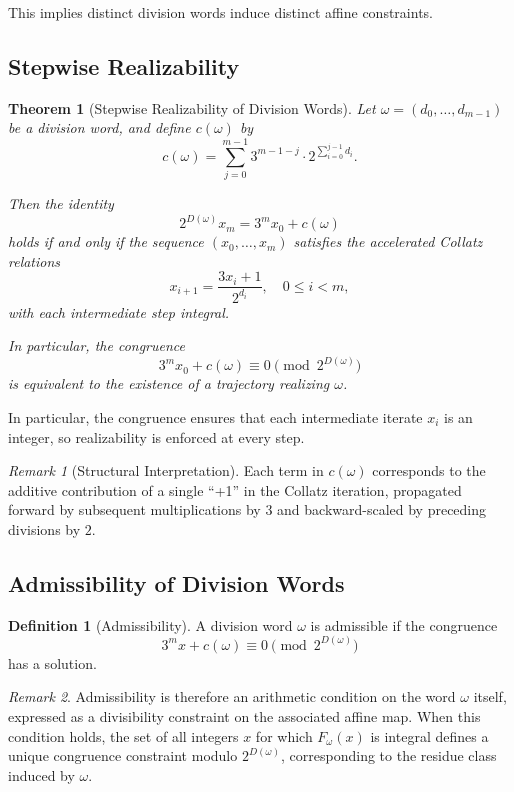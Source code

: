 \documentclass[12pt, oneside]{article}
\numberwithin{equation}{section}
\theoremstyle{definition}
\newtheorem{definition}{Definition}[section]
\theoremstyle{plain}
\newtheorem{theorem}{Theorem}[section]
\theoremstyle{remark}
\newtheorem*{remark}{Remark}
\begin{document}
This implies distinct division words induce distinct affine constraints.

\subsection{Stepwise Realizability}

\begin{theorem}[Stepwise Realizability of Division Words]
\label{thm:stepwise-realizability}
Let $\omega = (d_0,\dots,d_{m-1})$ be a division word, and define $c(\omega)$ by
\[
c(\omega)
=
\sum_{j=0}^{m-1}
3^{m-1-j}\cdot 2^{\sum_{i=0}^{j-1} d_i}.
\]

Then the identity
\[
2^{D(\omega)} x_m = 3^m x_0 + c(\omega)
\]
holds if and only if the sequence $(x_0,\dots,x_m)$ satisfies the accelerated
Collatz relations
\[
x_{i+1} = \frac{3x_i+1}{2^{d_i}}, \quad 0 \le i < m,
\]
with each intermediate step integral.

In particular, the congruence
\[
3^m x_0 + c(\omega) \equiv 0 \pmod{2^{D(\omega)}}
\]
is equivalent to the existence of a trajectory realizing $\omega$.
\end{theorem}

In particular, the congruence ensures that each intermediate iterate
$x_i$ is an integer, so realizability is enforced at every step.

\begin{remark}[Structural Interpretation]
Each term in $c(\omega)$ corresponds to the additive contribution of a single
``+1'' in the Collatz iteration, propagated forward by subsequent multiplications
by $3$ and backward-scaled by preceding divisions by $2$.
\end{remark}

\subsection{Admissibility of Division Words}

\begin{definition}[Admissibility]
\label{def:admissible-division-word}
A division word $\omega$ is admissible if the congruence
\[
3^m x + c(\omega) \equiv 0 \pmod{2^{D(\omega)}}
\]
has a solution.
\end{definition}
\begin{remark}
Admissibility is therefore an arithmetic condition on the word $\omega$
itself, expressed as a divisibility constraint on the associated affine
map. When this condition holds, the set of all integers $x$ for which
$F_\omega(x)$ is integral defines a unique congruence constraint modulo
$2^{D(\omega)}$, corresponding to the residue class induced by $\omega$.
\end{remark}
\end{document}
